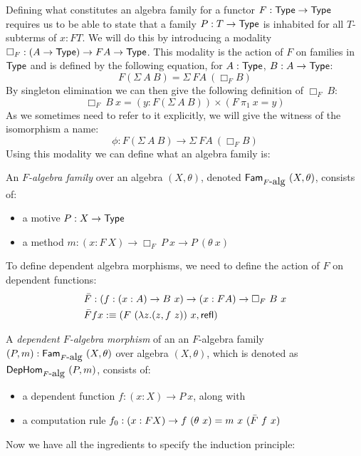 \documentclass[a4paper,10pt]{report}
\begin{document}
Defining what constitutes an algebra family for a functor
$F : \mathsf{Type} \to \mathsf{Type}$ requires us to be able to state that a family
$P : T \to \mathsf{Type}$ is inhabited for all $T$-subterms of $x : FT$. We
will do this by introducing a modality
$\Box_F : (A \to \mathsf{Type}) \to FA \to \mathsf{Type}$. This modality is the action
of $F$ on families in $\mathsf{Type}$ and is defined by the following
equation, for $A : \mathsf{Type}$, $B : A \to \mathsf{Type}$:
$$
F (\Sigma\ A\ B) = \Sigma\ FA\ (\Box_{F} B)
$$
By singleton elimination we can then give the following definition of $\Box_{F}\ B$:
$$
\Box_{F}\ B\ x = (y : F (\Sigma\ A\ B)) \times (F\ \pi_1\ x = y)
$$
As we sometimes need to refer to it explicitly, we will give the
witness of the isomorphism a name:
$$
\phi : F (\Sigma\ A\ B) \to \Sigma\ FA\ (\Box_{F} B)
$$
Using this modality we can define what an algebra family is:
%
\begin{defn}
  An \emph{$F$-algebra family} over an algebra $(X,\theta)$, denoted
  $\mathsf{Fam}_{F\mbox{-alg}}\ (X,\theta)$, consists of:

  \begin{itemize}
  \item a motive $P : X \to \mathsf{Type}$
  \item a method $m : (x : F\ X) \to \Box_F\ P\ x \to P\ (\theta\ x)$
  \end{itemize}
\end{defn}
%
To define dependent algebra morphisms, we need to define the action of
$F$ on dependent functions:
%
\begin{align*}
&\actionsection{F} : (f : (x : A) \to B\ x) \to (x : FA) \to \Box_F\ B\ x \\
&\actionsection{F} f x \ddefeq (F\ (\lambda z . (z , f\ z))\ x, \refl)
\end{align*}
%
\begin{defn}
  A \emph{dependent $F$-algebra morphism} of an an $F$-algebra family
  $(P,m) : \mathsf{Fam}_{F\mbox{-alg}}\ (X,\theta)$ over algebra
  $(X,\theta)$, which is denoted as $\mathsf{DepHom}_{F\mbox{-alg}}\ (P,m)$,
  consists of:

  \begin{itemize}
  \item a dependent function $f : (x : X) \to P\ x$, along with
  \item a computation rule $f_0 : (x : FX) \to f\ (\theta\ x) = m\ x\ (\bar{F}\ f\ x)$
  \end{itemize}
\end{defn}

Now we have all the ingredients to specify the induction principle:
\end{document}
